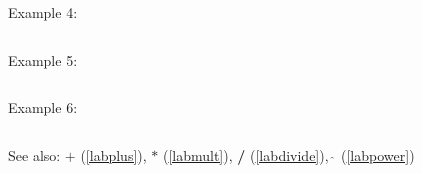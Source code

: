 \noindent Example 4: 
\begin{center}\begin{minipage}{15cm}\begin{Verbatim}[frame=single]
\end{Verbatim}
\end{minipage}\end{center}
\noindent Example 5: 
\begin{center}\begin{minipage}{15cm}\begin{Verbatim}[frame=single]
\end{Verbatim}
\end{minipage}\end{center}
\noindent Example 6: 
\begin{center}\begin{minipage}{15cm}\begin{Verbatim}[frame=single]
\end{Verbatim}
\end{minipage}\end{center}
See also: \textbf{$+$} (\ref{labplus}), \textbf{$*$} (\ref{labmult}), \textbf{/} (\ref{labdivide}), \textbf{$\mathbf{\hat{~}}$} (\ref{labpower})
